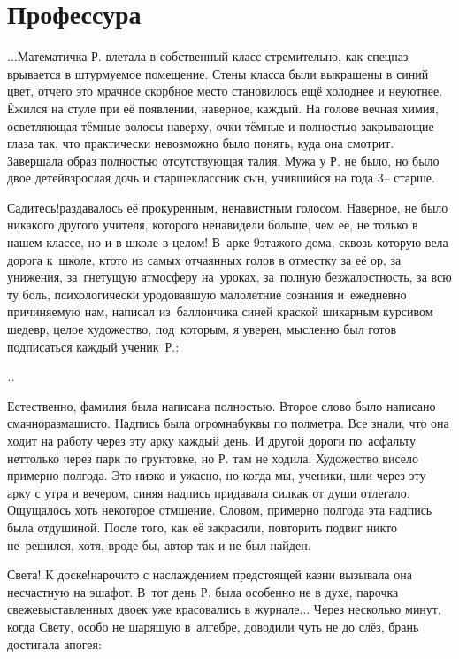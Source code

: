 \newpage
\section*{Профессура}

$\ldots$Математичка Р. влетала в собственный класс стремительно, как спецназ врывается в штурмуемое помещение. Стены класса были выкрашены в синий цвет, отчего это мрачное скорбное место становилось ещё холоднее и неуютнее. Ёжился на стуле при её появлении, наверное, каждый. На голове вечная химия, осветляющая тёмные волосы наверху, очки тёмные и полностью закрывающие глаза так, что практически невозможно было понять, куда она смотрит. Завершала образ полностью отсутствующая талия. Мужа у Р. не было, но было двое детей\mdash взрослая дочь и старшеклассник сын, учившийся на года 3\thinspace\nobreakdash-- старше.

\diagdash Садитесь!\mdash раздавалось её прокуренным, ненавистным голосом. Наверное, не было никакого другого учителя, которого ненавидели больше, чем её, не только в нашем классе, но и в школе в целом! В~арке 9\sdash этажого дома, сквозь которую вела дорога к~школе, кто\sdash то из самых отчаянных голов в отместку за её ор, за унижения, за~гнетущую атмосферу на~уроках, за~полную безжалостность, за всю ту боль, психологически уродовавшую малолетние сознания и~ежедневно причиняемую нам, написал из~баллончика синей краской шикарным курсивом шедевр, целое художество, под~которым, я уверен, мысленно был готов подписаться каждый ученик~Р.:
\begin{center}
\LARGE\textit{{.}\mdash {}.} 
\end{center}

Естественно, фамилия была написана полностью. Второе слово было написано смачно\sdash размашисто. Надпись была огромна\mdash буквы по полметра. Все знали, что она ходит на работу через эту арку каждый день. И другой дороги по~асфальту нет\mdash только через парк по грунтовке, но Р. там не ходила. Художество висело примерно полгода. Это низко и ужасно, но когда мы, ученики, шли через эту арку с утра и вечером, синяя надпись придавала сил\mdash как от души отлегало. Ощущалось хоть некоторое отмщение. Словом, примерно полгода эта надпись была отдушиной. После того, как её закрасили, повторить подвиг никто не~решился, хотя, вроде бы, автор так и не был найден.

\diagdash Света! К доске!\mdash нарочито с наслаждением предстоящей казни вызывала она несчастную на эшафот. В~тот день Р. была особенно не в духе, парочка свежевыставленных двоек уже красовались в журнале$\ldots$ Через несколько минут, когда Свету, особо не шарящую в~алгебре, доводили чуть не до слёз, брань достигала апогея:

